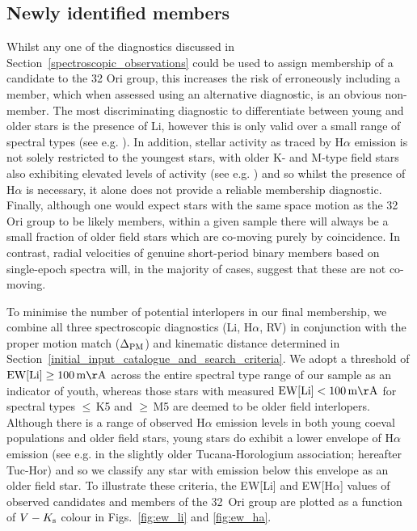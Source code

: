 \documentclass[usenatbib]{mnras}
\begin{document}
\subsection{Newly identified members}
\label{newly_identified_members}

Whilst any one of the diagnostics discussed in
Section~\ref{spectroscopic_observations} could be used to assign
membership of a candidate to the 32 Ori group, this increases the risk
of erroneously including a member, which when assessed using an
alternative diagnostic, is an obvious non-member.  The most
discriminating diagnostic to differentiate between young and older
stars is the presence of Li, however this is only valid over a small
range of spectral types (see e.g. \citealp{Jeffries06b}). In addition,
stellar activity as traced by H$\alpha$ emission is not solely
restricted to the youngest stars, with older K- and M-type field stars
also exhibiting elevated levels of activity (see
e.g. \citealp{West11}) and so whilst the presence of H$\alpha$ is
necessary, it alone does not provide a reliable membership
diagnostic. Finally, although one would expect stars with the same
space motion as the 32 Ori group to be likely members, within a given
sample there will always be a small fraction of older field stars
which are co-moving purely by coincidence. In contrast, radial
velocities of genuine short-period binary members based on
single-epoch spectra will, in the majority of cases, suggest that
these are not co-moving.

To minimise the number of potential interlopers in our final
membership, we combine all three spectroscopic diagnostics (Li,
H$\alpha$, RV) in conjunction with the proper motion match
($\Delta_{\rm PM}$) and kinematic distance determined in
Section~\ref{initial_input_catalogue_and_search_criteria}. We adopt a
threshold of $\mathrm{EW[Li]} \geq 100\,\rm{m\AA}$ across the entire
spectral type range of our sample as an indicator of youth, whereas
those stars with measured $\mathrm{EW[Li]}<100\,\rm{m\AA}$ for
spectral types $\leq$\,K5 and $\geq$\,M5 are deemed to be older field
interlopers. Although there is a range of observed H$\alpha$ emission
levels in both young coeval populations and older field stars, young
stars do exhibit a lower envelope of H$\alpha$ emission (see
e.g. \citealp{Kraus14} in the slightly older Tucana-Horologium
association; hereafter Tuc-Hor) and so we classify any star with
emission below this envelope as an older field star. To illustrate
these criteria, the EW[Li] and EW[H$\alpha$] values of observed
candidates and members of the 32~Ori group are plotted as a function
of $V-K_{\rm{s}}$ colour in Figs.~\ref{fig:ew_li} and \ref{fig:ew_ha}.
\end{document}
